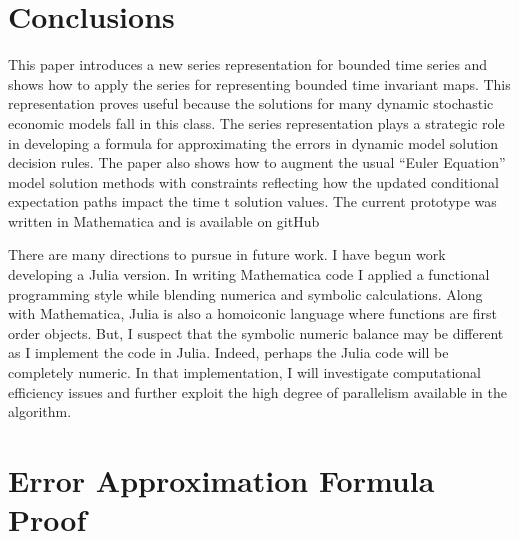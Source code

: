 \documentclass[12pt]{article}
\begin{document}
\section{Conclusions}
This paper introduces a new series representation for bounded time series and
shows how to apply the series for representing bounded time invariant maps.
This representation proves useful because the solutions for many
dynamic stochastic economic models fall in this class.
The series representation plays a strategic role in developing a formula for approximating the errors in dynamic model solution decision rules.  The paper
also shows how to  augment the usual ``Euler Equation'' model solution
methods with constraints reflecting how the updated
conditional expectation paths impact the time t solution values.
The current prototype was written in Mathematica and is available on gitHub


There are many directions to pursue in future work.
I have begun work  developing a Julia version.
In writing  Mathematica code I applied a functional programming style
while blending numerica and symbolic calculations. Along with
Mathematica, Julia is also a homoiconic language where functions are first order objects. But, I suspect that the 
symbolic numeric balance may be different as I implement the code in Julia.
Indeed, perhaps the Julia code will be completely numeric.
In that implementation, I 
will investigate computational efficiency issues and further
exploit the high degree of parallelism available in the algorithm.


\label{sec:conc}






\newpage

\clearpage
\appendix


\section{Error Approximation Formula Proof}
\label{sec:error-bound-formula}
\end{document}
